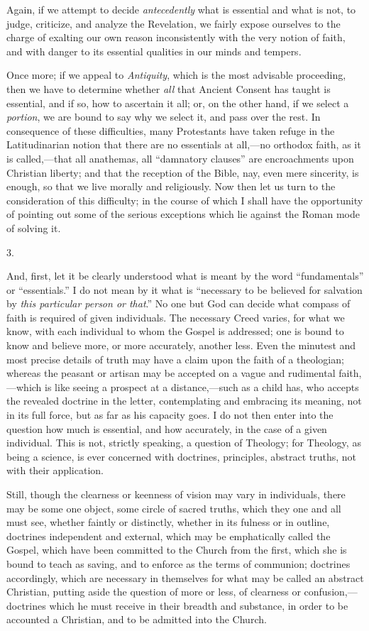 Again, if we attempt to decide \emph{antecedently} what is
essential and what is not, to judge, criticize, and analyze the
Revelation, we fairly expose ourselves to the charge of exalting our
own reason inconsistently with the very notion of faith, and with
danger to its essential qualities in our minds and tempers.

Once more; if we appeal to \emph{Antiquity}, which is the most
advisable proceeding, then we have to determine whether \emph{all}
that Ancient Consent has taught is essential, and if so, how to
ascertain it all; or, on the other hand, if we select a \emph{portion},
we are bound to say why we select it, and pass over the rest. In
consequence of these difficulties, many Protestants have taken refuge
in the Latitudinarian notion that there are no essentials at all,—no
orthodox faith, as it is called,—that all anathemas, all
``damnatory clauses'' are encroachments upon Christian
liberty; and that the reception of the Bible, nay, even mere
sincerity, is enough, so that we live morally and religiously. Now
then let us turn to the consideration of this difficulty; in the
course of which I shall have the opportunity of pointing out
some of the serious exceptions which lie against the Roman mode of
solving it.

3.

And, first, let it be clearly understood what is meant by the word
``fundamentals'' or ``essentials.'' I do not mean by
it what is ``necessary to be believed for salvation by \emph{this
particular person or that}.'' No one but God can decide what
compass of faith is required of given individuals. The necessary Creed
varies, for what we know, with each individual to whom the Gospel is
addressed; one is bound to know and believe more, or more accurately,
another less. Even the minutest and most precise details of truth may
have a claim upon the faith of a theologian; whereas the peasant or
artisan may be accepted on a vague and rudimental faith,—which is
like seeing a prospect at a distance,—such as a child has, who
accepts the revealed doctrine in the letter, contemplating and
embracing its meaning, not in its full force, but as far as his
capacity goes. I do not then enter into the question how much is
essential, and how accurately, in the case of a given individual. This
is not, strictly speaking, a question of Theology; for Theology, as
being a science, is ever concerned with doctrines, principles,
abstract truths, not with their application.

Still, though the clearness or keenness of vision may vary in
individuals, there may be some one object, some circle of sacred
truths, which they one and all must see, whether faintly or
distinctly, whether in its fulness or in outline, doctrines
independent and external, which may be emphatically called the Gospel,
which have been committed to the Church from the first, which she is
bound to teach as saving, and to enforce as the terms of communion;
doctrines accordingly, which are necessary in themselves for what may
be called an abstract Christian, putting aside the question of
more or less, of clearness or confusion,—doctrines which he must
receive in their breadth and substance, in order to be accounted a
Christian, and to be admitted into the Church.


